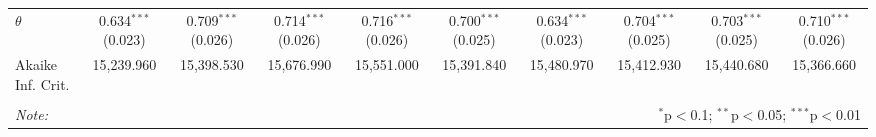 \begin{table}[!htbp]
\begin{tabular}{@{\extracolsep{1pt}}lccccccccc}
$\theta$ & 0.634$^{***}$  (0.023) & 0.709$^{***}$  (0.026) & 0.714$^{***}$  (0.026) & 0.716$^{***}$  (0.026) & 0.700$^{***}$  (0.025) & 0.634$^{***}$  (0.023) & 0.704$^{***}$  (0.025) & 0.703$^{***}$  (0.025) & 0.710$^{***}$  (0.026) \\ 
Akaike Inf. Crit. & 15,239.960 & 15,398.530 & 15,676.990 & 15,551.000 & 15,391.840 & 15,480.970 & 15,412.930 & 15,440.680 & 15,366.660 \\ 
\hline 
\hline \\[-1.8ex] 
\textit{Note:}  & \multicolumn{9}{r}{$^{*}$p$<$0.1; $^{**}$p$<$0.05; $^{***}$p$<$0.01} \\ 
\end{tabular} 
\end{table} 

